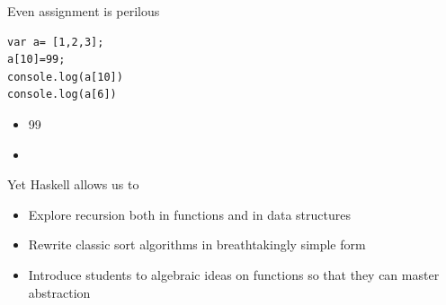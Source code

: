 \documentclass[presetation]{beamer}
\begin{document}
\begin{frame}[fragile,label={sec:org960434e}]{Even assignment is perilous}
 \begin{verbatim}
var a= [1,2,3];
a[10]=99;
console.log(a[10])
console.log(a[6])
\end{verbatim}
\pause
\begin{itemize}
\item 99
\item{}
\end{itemize}
\end{frame}

\begin{frame}[label={sec:org2a20c0a}]{Yet Haskell allows us to}
\pause
\begin{itemize}
\item Explore recursion both in functions and in data structures
\end{itemize}
\pause
\begin{itemize}
\item Rewrite classic sort algorithms in breathtakingly simple form
\end{itemize}
\pause
\begin{itemize}
\item Introduce students to algebraic ideas on functions so that they can
master abstraction
\end{itemize}
\end{frame}
\end{document}

